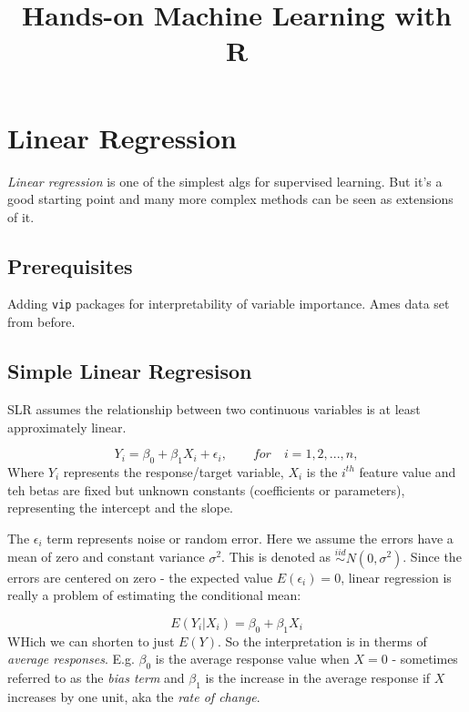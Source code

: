 \documentclass[]{article}
\title{Hands-on Machine Learning with R}
\author{}
\date{}
\begin{document}
\maketitle

\setcounter{section}{3}

\hypertarget{linear-regression}{%
\section{Linear Regression}\label{linear-regression}}

\emph{Linear regression} is one of the simplest algs for supervised
learning. But it's a good starting point and many more complex methods
can be seen as extensions of it.

\hypertarget{prerequisites}{%
\subsection{Prerequisites}\label{prerequisites}}

Adding \texttt{vip} packages for interpretability of variable
importance. Ames data set from before.

\hypertarget{simple-linear-regresison}{%
\subsection{Simple Linear Regresison}\label{simple-linear-regresison}}

SLR assumes the relationship between two continuous variables is at
least approximately linear.

\[Y_i=\beta_0+\beta_1 X_i+\epsilon_i, \qquad for \quad i=1,2,...,n,\]
Where \(Y_i\) represents the response/target variable, \(X_i\) is the
\(i^{th}\) feature value and teh betas are fixed but unknown constants
(coefficients or parameters), representing the intercept and the slope.

The \(\epsilon_i\) term represents noise or random error. Here we assume
the errors have a mean of zero and constant variance \(\sigma^2\). This
is denoted as \(\stackrel{iid}{\sim}N(0, \sigma^2)\). Since the errors
are centered on zero - the expected value \(E(\epsilon_i) = 0\), linear
regression is really a problem of estimating the conditional mean:

\[E(Y_i|X_i) = \beta_0+\beta_1 X_i\] WHich we can shorten to just
\(E(Y)\). So the interpretation is in therms of \emph{average
responses}. E.g. \(\beta_0\) is the average response value when \(X=0\)
- sometimes referred to as the \emph{bias term} and \(\beta_1\) is the
increase in the average response if \(X\) increases by one unit, aka the
\emph{rate of change}.
\end{document}
